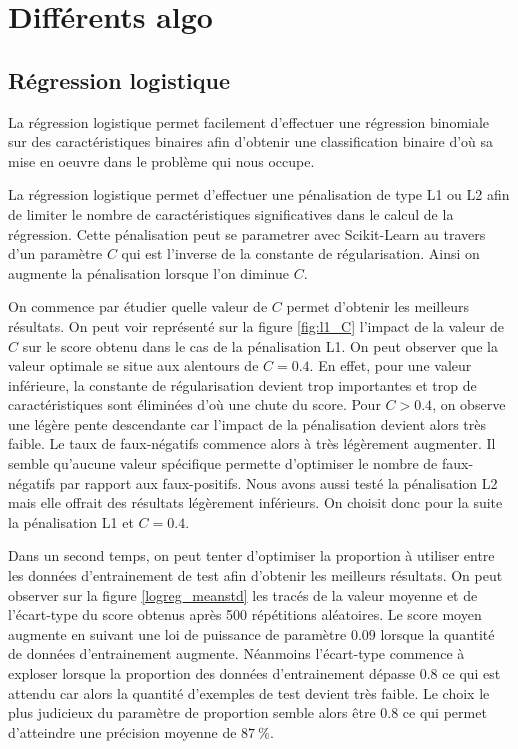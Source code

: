 \documentclass[11pt,a4paper]{article}
\begin{document}
\section{Différents algo}
	\subsection{Régression logistique}
		La régression logistique permet facilement d'effectuer une régression binomiale sur des caractéristiques binaires afin d'obtenir une classification binaire d'où sa mise en oeuvre dans le problème qui nous occupe.

		La régression logistique permet d'effectuer une pénalisation de type L1 ou L2 afin de limiter le nombre de caractéristiques significatives dans le calcul de la régression. Cette pénalisation peut se parametrer avec Scikit-Learn au travers d'un paramètre $C$ qui est l'inverse de la constante de régularisation. Ainsi on augmente la pénalisation lorsque l'on diminue $C$.

		On commence par étudier quelle valeur de $C$ permet d'obtenir les meilleurs résultats. On peut voir représenté sur la figure \ref{fig:l1_C} l'impact de la valeur de $C$ sur le score obtenu dans le cas de la pénalisation L1. On peut observer que la valeur optimale se situe aux alentours de $C=0.4$. En effet, pour une valeur inférieure, la constante de régularisation devient trop importantes et trop de caractéristiques sont éliminées d'où une chute du score. Pour $C>0.4$, on observe une légère pente descendante car l'impact de la pénalisation devient alors très faible. Le taux de faux-négatifs commence alors à très légèrement augmenter. Il semble qu'aucune valeur spécifique permette d'optimiser le nombre de faux-négatifs par rapport aux faux-positifs. Nous avons aussi testé la pénalisation L2 mais elle offrait des résultats légèrement inférieurs. On choisit donc pour la suite la pénalisation L1 et $C=0.4$.

		Dans un second temps, on peut tenter d'optimiser la proportion à utiliser entre les données d'entrainement de test afin d'obtenir les meilleurs résultats. On peut observer sur la figure \ref{logreg_meanstd} les tracés de la valeur moyenne et de l'écart-type du score obtenus après 500 répétitions aléatoires. Le score moyen augmente en suivant une loi de puissance de paramètre $0.09$ lorsque la quantité de données d'entrainement augmente. Néanmoins l'écart-type commence à exploser lorsque la proportion des données d'entrainement dépasse $0.8$ ce qui est attendu car alors la quantité d'exemples de test devient très faible. Le choix le plus judicieux du paramètre de proportion semble alors être $0.8$ ce qui permet d'atteindre une précision moyenne de $\SI{87}{\percent}$.
\end{document}
